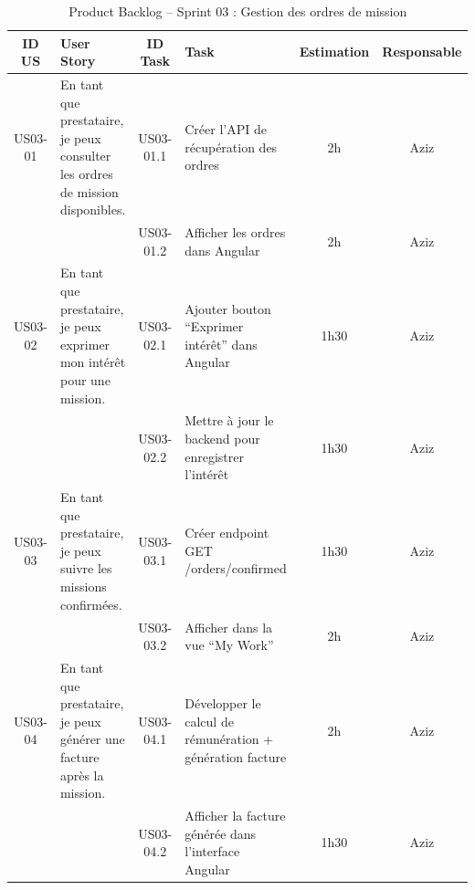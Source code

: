 \begin{table}[H]
\centering

\begin{tabular}{|c|p{4.2cm}|c|p{5cm}|c|c|}
\hline
\textbf{ID US} & \textbf{User Story} & \textbf{ID Task} & \textbf{Task} & \textbf{Estimation} & \textbf{Responsable} \\
\hline

US03-01 & En tant que prestataire, je peux consulter les ordres de mission disponibles.
     & US03-01.1 & Créer l’API de récupération des ordres & 2h & Aziz \\
     \cline{3-6}
     & & US03-01.2 & Afficher les ordres dans Angular & 2h & Aziz \\
\hline

US03-02 & En tant que prestataire, je peux exprimer mon intérêt pour une mission. 
     & US03-02.1 & Ajouter bouton “Exprimer intérêt” dans Angular & 1h30 & Aziz \\
     \cline{3-6}
     & & US03-02.2 & Mettre à jour le backend pour enregistrer l’intérêt & 1h30 & Aziz \\
\hline

US03-03 & En tant que prestataire, je peux suivre les missions confirmées. 
     & US03-03.1 & Créer endpoint GET /orders/confirmed & 1h30 & Aziz \\
     \cline{3-6}
     & & US03-03.2 & Afficher dans la vue “My Work” & 2h & Aziz \\
\hline

US03-04 & En tant que prestataire, je peux générer une facture après la mission. 
     & US03-04.1 & Développer le calcul de rémunération + génération facture & 2h & Aziz \\
     \cline{3-6}
     & & US03-04.2 & Afficher la facture générée dans l’interface Angular & 1h30 & Aziz \\
\hline

\end{tabular}
\caption{Product Backlog – Sprint 03 : Gestion des ordres de mission}
\label{tab:product_backlog_orders}
\end{table}


